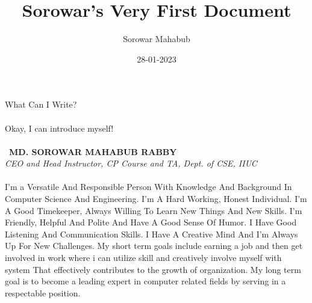 \documentclass{article}
\title{Sorowar's Very First Document}
\date{28-01-2023}
\author{Sorowar Mahabub}
\begin{document}
  \maketitle
  \newpage
	What Can I Write?
  \\\\Okay, I can introduce myself!
\\\\\ \textbf{MD. SOROWAR MAHABUB RABBY}
\\ \textit{CEO and Head Instructor, CP Course and TA, Dept. of CSE, IIUC}
\\\\ I'm a Versatile And Responsible Person With Knowledge And Background In Computer Science And Engineering. I'm A Hard
Working, Honest Individual. I'm A Good Timekeeper, Always Willing To Learn New Things And New Skills. I'm Friendly, Helpful
And Polite And Have A Good Sense Of Humor. I Have Good Listening And Communication Skills. I Have A Creative Mind And
I'm Always Up For New Challenges. My short term goals include earning a job and then get involved in work where i can utilize
skill and creatively involve myself with system That effectively contributes to the growth of organization. My long term goal is
to become a leading expert in computer related fields by serving in a respectable position.
\end{document}
